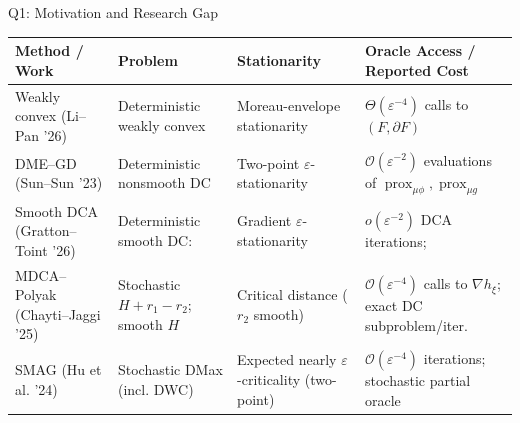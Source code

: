 \documentclass[10pt]{beamer}
\begin{document}


    
\begin{frame}{Q1: Motivation and Research Gap}
\scriptsize
\centering
\setlength{\tabcolsep}{3pt}
\renewcommand{\arraystretch}{1.10}

\begin{tabular}{
    >{\raggedright\arraybackslash}p{}
    >{\raggedright\arraybackslash}p{}
    >{\raggedright\arraybackslash}p{}
    >{\raggedright\arraybackslash}p{}}
\toprule
\textbf{Method / Work}
& \textbf{Problem}
& \textbf{Stationarity}
& \textbf{Oracle Access / Reported Cost} \\
\midrule
Weakly convex\newline
(Li--Pan '26)
& Deterministic weakly convex
& Moreau-envelope stationarity
& $\Theta(\varepsilon^{-4})$ calls to
  $(F,\partial F)$ \\

DME--GD\newline
(Sun--Sun '23)
& Deterministic nonsmooth DC
& Two-point $\varepsilon$-stationarity
& $\mathcal O(\varepsilon^{-2})$ evaluations of
  $\operatorname{prox}_{\mu\phi},\operatorname{prox}_{\mu g}$ \\

Smooth DCA\newline
(Gratton--Toint '26)
& Deterministic smooth DC:
& Gradient $\varepsilon$-stationarity
& $o(\varepsilon^{-2})$ DCA iterations;\\

MDCA--Polyak\newline
(Chayti--Jaggi '25)
& Stochastic $H+r_1-r_2$; smooth $H$
& Critical distance ($r_2$ smooth)
& $\mathcal O(\varepsilon^{-4})$ calls to $\nabla h_\xi$;
  exact DC subproblem/iter. \\

SMAG\newline
(Hu et al. '24)
& Stochastic DMax (incl. DWC)
& Expected nearly $\varepsilon$-criticality (two-point)
& $\mathcal O(\varepsilon^{-4})$ iterations;
  stochastic partial oracle \\

\bottomrule
\end{tabular}


\end{frame}
\end{document}
